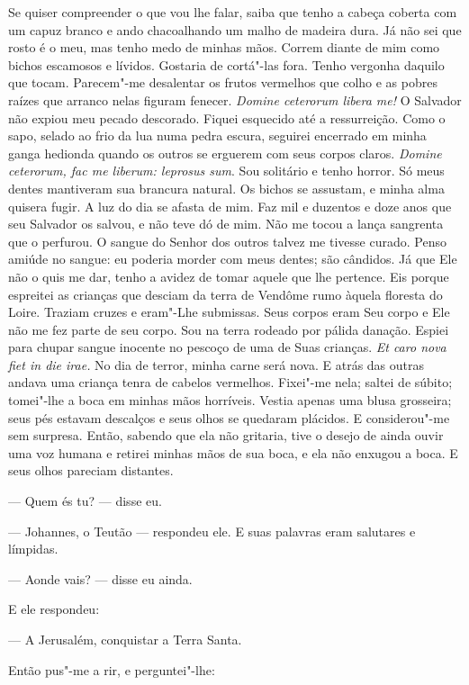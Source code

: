 Se quiser compreender o que vou lhe falar, saiba que tenho a cabeça coberta
com um capuz branco e ando chacoalhando um malho de madeira dura. Já não
sei que rosto é o meu, mas tenho medo de minhas mãos. Correm diante de mim
como bichos escamosos e lívidos. Gostaria de cortá"-las fora. Tenho
vergonha daquilo que tocam. Parecem"-me desalentar os frutos vermelhos que
colho e as pobres raízes que arranco nelas figuram fenecer. \textit{Domine
ceterorum libera me!} O Salvador não expiou meu pecado descorado. Fiquei
esquecido até a ressurreição. Como o sapo, selado ao frio da lua numa
pedra escura, seguirei encerrado em minha ganga hedionda quando os outros
se erguerem com seus corpos claros. \textit{Domine ceterorum, fac me
liberum: leprosus sum}.  Sou solitário e tenho horror. Só meus
dentes mantiveram sua brancura natural. Os bichos se assustam, e minha
alma quisera fugir. A luz do dia se afasta de mim. Faz mil e duzentos e
doze anos que seu Salvador os salvou, e não teve dó de mim. Não me tocou a
lança sangrenta que o perfurou. O sangue do Senhor dos outros talvez me
tivesse curado. Penso amiúde no sangue: eu poderia morder com meus dentes;
são cândidos. Já que Ele não o quis me dar, tenho a avidez de tomar aquele
que lhe pertence. Eis porque espreitei as crianças que desciam da terra de
Vendôme rumo àquela floresta do Loire. Traziam cruzes e eram"-Lhe
submissas. Seus corpos eram Seu corpo e Ele não me fez parte de seu corpo.
Sou na terra rodeado por pálida danação. Espiei para chupar sangue
inocente no pescoço de uma de Suas crianças. \textit{Et caro nova fiet in
die irae.} No dia de terror, minha carne será nova. E atrás das outras
andava uma criança tenra de cabelos vermelhos. Fixei"-me nela; saltei de
súbito; tomei"-lhe a boca em minhas mãos horríveis. Vestia apenas uma blusa
grosseira; seus pés estavam descalços e seus olhos se quedaram plácidos. E
considerou"-me sem surpresa. Então, sabendo que ela não gritaria, tive o
desejo de ainda ouvir uma voz humana e retirei minhas mãos de sua boca, e
ela não enxugou a boca. E seus olhos pareciam distantes.

--- Quem és tu? --- disse eu.

--- Johannes, o Teutão --- respondeu ele. E suas palavras eram salutares e
límpidas.

--- Aonde vais? --- disse eu ainda.

E ele respondeu:

--- A Jerusalém, conquistar a Terra Santa.

Então pus"-me a rir, e perguntei"-lhe:

